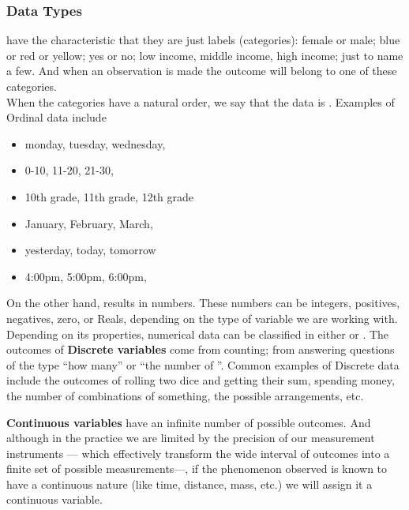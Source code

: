 \subsubsection{Data Types}
\noindent {} have the characteristic that they are just labels (categories): female or male; blue or red or yellow; yes or no; low income, middle income, high income; just to name a few. And when an observation is made the outcome will belong to one of these categories.
\\ 
When the categories have a natural order, we say that the data is . Examples of Ordinal data include
\begin{multicols}{2}
\begin{itemize}
\item monday, tuesday, wednesday,\textellipsis
\item 0-10, 11-20, 21-30, \textellipsis
\item 10th grade, 11th grade, 12th grade
\item January, February, March, \textellipsis
\item yesterday, today, tomorrow
\item 4:00pm, 5:00pm, 6:00pm, \textellipsis
\end{itemize}
\end{multicols}


On the other hand,  results in numbers. These numbers can be integers, positives, negatives, zero, or Reals, depending on the type of variable we are working with.
\\
Depending on its properties, numerical data can be classified in either  or . 
\vspace{0.5cm}
The outcomes of \textbf{Discrete variables} come from counting; from answering questions of the type ``how many\textellipsis'' or ``the number of \textellipsis''. 
Common examples of Discrete data include the outcomes of rolling two dice and getting their sum, spending money, the number of combinations of something, the possible arrangements, etc.


\textbf{Continuous variables} have an infinite number of possible outcomes. And although in the practice we are limited by the precision of our measurement instruments — which effectively transform the wide interval of outcomes into a finite set of possible measurements—, if the phenomenon observed is known to have a continuous nature (like time, distance, mass, etc.) we will assign it a continuous variable. \\

